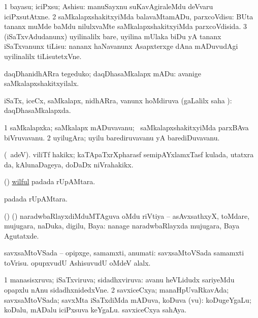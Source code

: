 \bentry
{} 
\gl{\sakirx}
\bmng
\bnum
\num{1} bayasu; iciPxsu; Ashisu:  manuSayxnu suKavAgiraleMdu deVvaru iciPxsutAtxne. 
\num{2} saMkalapxshakitxyiMda balavaMtamADu, parxcoVdisu:  BUta tananx muMde baMdu nilulxvaMte saMkalapxshakitxyiMda parxcoVdisida. 
\num{3} (iSaTxvAdudanunx) uyilinalilx bare, uyilina mUlaka biDu yA tananx iSaTxvanunx tiLisu:  nananx haNavanunx Asapxterxge dAna mADuvudAgi uyilinalilx tiLisutetxVne. 
\enum
\emng

\noindent 
\gl{\akirx}
\bmng
daqDhanidhARra tegeduko; daqDhasaMkalapx mADu:  avanige saMkalapxshakitxyilalx. 
\emng
\eentry

\bentry
{}
\gl{\gu}
\bmng
iSaTx, iceCx, saMkalapx, nidhARra, \mo vanunx hoMdiruva (\saMpa gaLalilx saha \parx):  daqDhasaMkalapxda. 
\emng
\eentry

\bentry
{}
\gl{\nA}
\bmng
\bnum
\num{1} saMkalapxka; saMkalapx mADuvavanu; \kanmu\ saMkalapxshakitxyiMda parxBAva biVruvavanu. 
\num{2} uyilugAra; uyilu barediruvavanu yA barediDuvavanu. 
\enum
\emng
\eentry

\bentry
{}
\gl{\nA}
\bmng
(\bava\ adeV). viliTf hakikx; kaTApaTxrXpharasf semipAYxlamxTasf kulada, utatxra \ame da, kAlunaDageya, doDaDx niVrahakikx. 
\emng
\eentry

\bentry
{} 
\gl{\gu}
\expl{}
\bmng
(\ame) \hyperlink{wilful}{wilful} padada rUpAMtara. 
\emng
\eentry

\bentry
{}
\gl{\nA}
\bmng
{} padada rUpAMtara. 
\emng
\eentry

\bentry
{}
\gl{\nA}
\bmng
(\bava) (\AmA) naradwbaRlayxdiMduMTAguva oMdu riVtiya -- asAvxsathxyX, toMdare, mujugara, naDuka, digilu, Baya:  nanage naradwbaRlayxda mujugara, Baya Agutatxde. 
\emng
\eentry

\bentry
{} 
\gl{\nA}
\expl{}
\bmng
savxsaMtoVSada -- opipxge, samamxti, anumati:  savxsaMtoVSada samamxti toVrisu.  opupxvudU AshisuvudU oMdeV alalx. 
\emng
\eentry

\bentry
{} 
\gl{\gu}
\bmng
\bnum
\num{1} manasisxruva; iSaTxviruva; sidadhxviruva:  avanu heVLidudx sariyeMdu opapxlu nAnu sidadhxnidedxVne. 
\num{2} savxiceCxya; manaHpUvaRkavAda; savxsaMtoVSada; savxMta iSaTxdiMda mADuva, koDuva (\mo vu):  koDugeYgaLu; koDalu, mADalu iciPxsuva keYgaLu.  savxiceCxya sahAya. 
\enum
\emng

